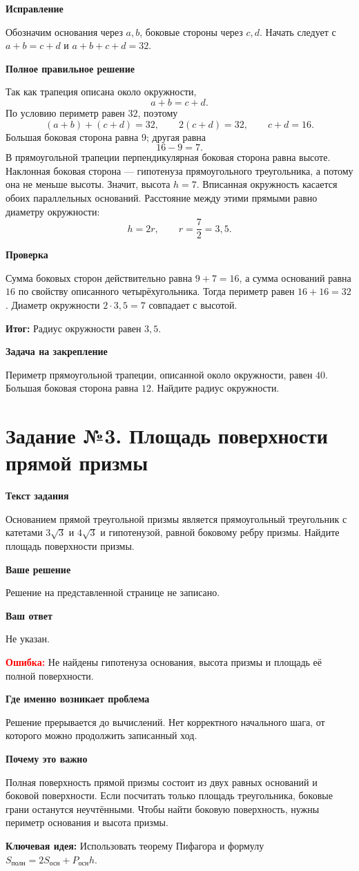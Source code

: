 \documentclass[11pt,a4paper]{article}
\newcommand{\task}[2]{\newpage\phantomsection\label{task:#1}\section*{Задание №#1. #2}}
\newcommand{\err}[1]{\par\textcolor{red}{\textbf{Ошибка:}} #1\par}
\newcommand{\keyidea}[1]{\par\textcolor{blue!60!black}{\textbf{Ключевая идея:}} #1\par}
\newcommand{\conclusion}[1]{\par\textcolor{teal!60!black}{\textbf{Итог:}} #1\par}
\newcommand{\itemhead}[1]{\par\medskip\textbf{#1}\par}
\begin{document}
\itemhead{Исправление}
Обозначим основания через $a,b$, боковые стороны через $c,d$.
Начать следует с $a+b=c+d$ и $a+b+c+d=32$.
\itemhead{Полное правильное решение}
Так как трапеция описана около окружности,
\[
a+b=c+d.
\]
По условию периметр равен $32$, поэтому
\[
(a+b)+(c+d)=32,\qquad 2(c+d)=32,\qquad c+d=16.
\]
Большая боковая сторона равна $9$; другая равна
\[
16-9=7.
\]
В прямоугольной трапеции перпендикулярная боковая сторона равна высоте. Наклонная боковая сторона --- гипотенуза прямоугольного треугольника, а потому она не меньше высоты. Значит, высота $h=7$.
Вписанная окружность касается обоих параллельных оснований. Расстояние между этими прямыми равно диаметру окружности:
\[
h=2r,\qquad r=\frac{7}{2}=3{,}5.
\]
\itemhead{Проверка}
Сумма боковых сторон действительно равна $9+7=16$, а сумма оснований равна $16$ по свойству описанного четырёхугольника. Тогда периметр равен $16+16=32$. Диаметр окружности $2\cdot 3{,}5=7$ совпадает с высотой.
\conclusion{Радиус окружности равен $3{,}5$.}
\itemhead{Задача на закрепление}
Периметр прямоугольной трапеции, описанной около окружности, равен $40$. Большая боковая сторона равна $12$. Найдите радиус окружности.

\task{3}{Площадь поверхности прямой призмы}
\itemhead{Текст задания}
Основанием прямой треугольной призмы является прямоугольный треугольник с катетами $3\sqrt3$ и $4\sqrt3$ и гипотенузой, равной боковому ребру призмы. Найдите площадь поверхности призмы.
\itemhead{Ваше решение}
Решение на представленной странице не записано.
\itemhead{Ваш ответ}
Не указан.
\err{Не найдены гипотенуза основания, высота призмы и площадь её полной поверхности.}
\itemhead{Где именно возникает проблема}
Решение прерывается до вычислений. Нет корректного начального шага, от которого можно продолжить записанный ход.
\itemhead{Почему это важно}
Полная поверхность прямой призмы состоит из двух равных оснований и боковой поверхности. Если посчитать только площадь треугольника, боковые грани останутся неучтёнными. Чтобы найти боковую поверхность, нужны периметр основания и высота призмы.
\keyidea{Использовать теорему Пифагора и формулу $S_{\text{полн}}=2S_{\text{осн}}+P_{\text{осн}}h$.}
\end{document}
